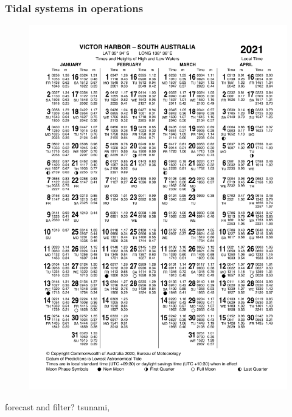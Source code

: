 \begin{frame}
\frametitle{Tidal systems in operations}

\begin{minipage}{0.45\textwidth}
    \begin{figure}      
    \includegraphics[height=0.4\textheight]{figures/images/IDO59001_2021_SA_TP006.pdf}
    \end{figure}
    forecast and filter?
    tsunami, 
\end{minipage}

\hfill


\end{frame}
